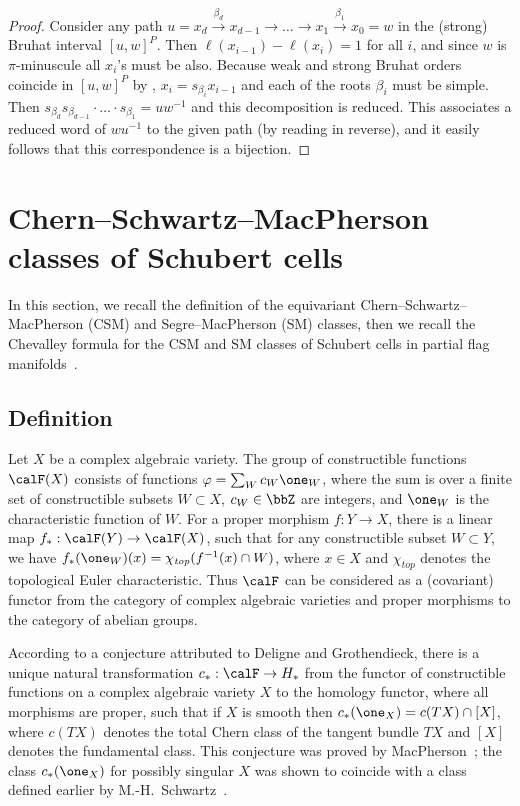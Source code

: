 \begin{proof} Consider any path 
	$u=x_d\overset{\beta_d}{\to} x_{d-1}\to \ldots \to x_1\overset{\beta_1}{\to} x_0=w$
	in the (strong) Bruhat interval $[u,w]^P$. Then $\ell(x_{i-1}) - \ell(x_{i}) = 1$ for all $i$, and
	since $w$ is $\pi$-minuscule all $x_i$'s must be also. Because weak and strong 
	Bruhat orders coincide in $[u,w]^P$ by ,
	$x_{i} = s_{\beta_i} x_{i-1}$ and each of the roots $\beta_i$ must be simple. Then
	$s_{\beta_d}s_{\beta_{d-1}} \cdot \ldots \cdot s_{\beta_1}= uw^{-1}$ and this decomposition
	is reduced. This associates a reduced word of $wu^{-1}$ to the given path (by reading in reverse), 
	and it easily follows that this correspondence is a bijection.\end{proof}

\section{Chern--Schwartz--MacPherson classes of Schubert cells}\label{sec:eqCSM}
In this section, we recall the definition of the equivariant Chern--Schwartz--MacPherson (CSM) and Segre--MacPherson (SM) classes, 
then we recall the Chevalley formula for the CSM and SM classes of Schubert cells in partial flag manifolds~\cite{AMSS:shadows,su:quantum}.

\subsection{Definition}
Let $X$ be a complex algebraic variety. The group of constructible functions $\calF(X)$ consists of functions $\varphi = \sum_W c_W \one_W$, where the sum is over a finite set of constructible subsets $W \subset X$,
$c_W \in \bbZ$ are integers, and $\one_W$ is the characteristic function of $W$.
For a proper morphism $f:Y\rightarrow X$, there is a linear map \mbox{$f_*:\calF(Y)\rightarrow \calF(X)$}, such that for any constructible subset $W\subset Y$, we have $f_*(\one_W)(x)=\chi_{\textit{top}}(f^{-1}(x)\cap W)$, where $x\in X$ and $\chi_{\textit{top}}$ denotes the topological Euler characteristic.
Thus $\calF$ can be considered as a (covariant) functor from the category of complex algebraic varieties and 
proper morphisms to the category of abelian groups.

According to a conjecture attributed to Deligne and Grothendieck, there is a unique natural transformation $c_*: \calF \to H_*$ from the functor of constructible functions on a complex algebraic variety $X$ to the homology functor, where all morphisms are proper, such that if $X$ is smooth then $c_*(\one_X)=c(TX)\cap [X]$, {where $c(TX)$ denotes the total Chern class of the tangent bundle $TX$ and $[X]$ denotes the fundamental class}.  This conjecture was proved by MacPherson~\cite{macpherson:chern}; the class $c_*(\one_X)$ for possibly singular $X$ was shown to coincide with a class defined earlier by M.-H.~Schwartz~\cite{schwartz:1, schwartz:2, BS81}. 

